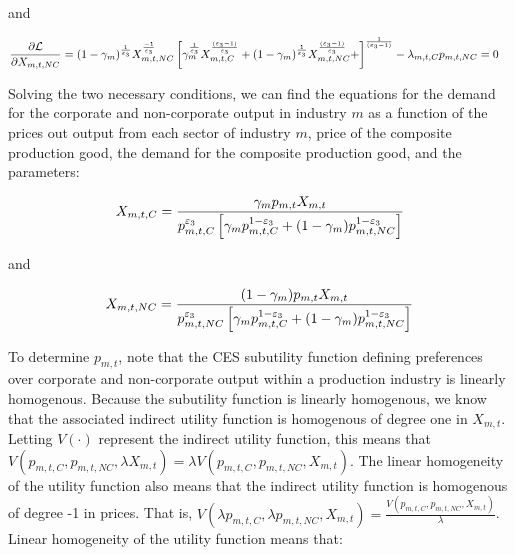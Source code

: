    and
   
\begin{equation} \label{eqn:comp_output_foc_NC}
	\begin{split}
       	&  \frac{\partial \mathcal{L}}{\partial X_{m,t,NC}} = (1-\gamma_{m})^{\frac{1}{\varepsilon_{3}}} X_{m,t,NC}^{\frac{-1}{\varepsilon_{3}}} \left[\gamma_{m}^{\frac{1}{\varepsilon_{3}}}X_{m,t,C}^{\frac{(\varepsilon_{3}-1)}{\varepsilon_{3}}}+(1-\gamma_{m})^{\frac{1}{\varepsilon_{3}}}X_{m,t,NC}^{\frac{(\varepsilon_{3}-1)}{\varepsilon_{3}}}+\right]^{\frac{1}{(\varepsilon_{3}-1)}} - \lambda_{m,t,C} p_{m,t,NC} = 0
	\end{split}
\end{equation}
    
    Solving the two necessary conditions, we can find the equations for the demand for the corporate and non-corporate output in industry $m$ as a function of the prices out output from each sector of industry $m$, price of the composite production good, the demand for the composite production good, and the parameters:
    
\begin{equation} \label{eqn:demand_XmtC}
	X_{m,t,C} = \frac{\gamma_{m}p_{m,t}X_{m,t}}{p_{m,t,C}^{\varepsilon_{3}}\left[\gamma_{m}p_{m,t,C}^{1-\varepsilon_{3}}+(1-\gamma_{m})p_{m,t,NC}^{1-\varepsilon_{3}}\right]}
\end{equation}
    
    and 
    
    \begin{equation} \label{eqn:demand_XmtNC}
	X_{m,t,NC} = \frac{(1-\gamma_{m})p_{m,t}X_{m,t}}{p_{m,t,NC}^{\varepsilon_{3}}\left[\gamma_{m}p_{m,t,C}^{1-\varepsilon_{3}}+(1-\gamma_{m})p_{m,t,NC}^{1-\varepsilon_{3}}\right]}
\end{equation}

To determine $p_{m,t}$, note that the CES subutility function defining preferences over corporate and non-corporate output within a production industry is linearly homogenous.  Because the subutility function is linearly homogenous, we know that the associated indirect utility function is homogenous of degree one in $X_{m,t}$.  Letting $V(\cdot)$ represent the indirect utility function, this means that $V(p_{m,t,C},p_{m,t,NC},\lambda X_{m,t}) = \lambda V(p_{m,t,C},p_{m,t,NC}, X_{m,t})$.  The linear homogeneity of the utility function also means that the indirect utility function is homogenous of degree -1 in prices.  That is, $V(\lambda p_{m,t,C},\lambda p_{m,t,NC}, X_{m,t}) = \frac{V(p_{m,t,C},p_{m,t,NC}, X_{m,t})}{\lambda}$. Linear homogeneity of the utility function means that: 

